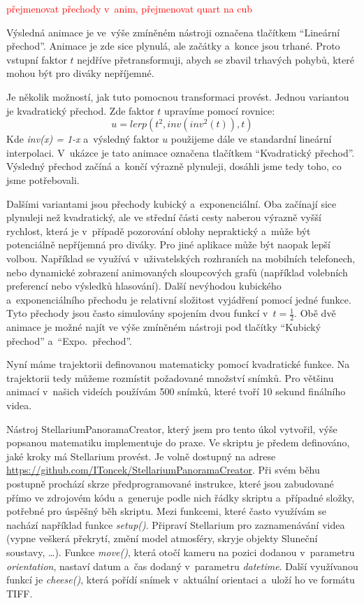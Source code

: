 \documentclass[12pt,a4paper,titlepage]{article}
\begin{document}
\textcolor{red}{přejmenovat přechody v~anim, přejmenovat quart na cub}

Výsledná animace je ve~výše zmíněném nástroji označena tlačítkem \enquote{Lineární přechod}. Animace je zde sice plynulá, ale začátky a~konce jsou trhané. Proto vstupní faktor $t$ nejdříve přetransformuji, abych se zbavil trhavých pohybů, které mohou být pro diváky nepříjemné. 

Je několik možností, jak tuto pomocnou transformaci provést. Jednou variantou je kvadratický přechod. Zde faktor $t$ upravíme pomocí rovnice:
\[u = lerp({t}^{2}, inv({inv}^{2}(t)), t)\]
Kde \textit{inv(x) = 1-x} a~výsledný faktor $u$ použijeme dále ve standardní lineární interpolaci.  V~ukázce je tato animace označena tlačítkem \enquote{Kvadratický přechod}. Výsledný přechod začíná a~končí výrazně plynuleji, dosáhli jsme tedy toho, co jsme potřebovali. %

Dalšími variantami jsou přechody kubický a~exponenciální. Oba začínají sice plynuleji než kvadratický, ale ve střední části cesty naberou výrazně vyšší rychlost, která je v~případě pozorování oblohy nepraktický a~může být potenciálně nepříjemná pro diváky. Pro jiné aplikace může být naopak lepší volbou. Například se využívá v~uživatelských rozhraních na mobilních telefonech, nebo dynamické zobrazení animovaných sloupcových grafů (například volebních preferencí nebo výsledků hlasování). Další nevýhodou kubického a~exponenciálního přechodu je relativní složitost vyjádření pomocí jedné funkce. Tyto přechody jsou často simulovány spojením dvou funkcí v~$t=\frac{1}{2}$. Obě dvě animace je možné najít ve výše zmíněném nástroji pod tlačítky \enquote{Kubický přechod} a~\enquote{Expo.\ přechod}.

Nyní máme trajektorii definovanou matematicky pomocí kvadratické funkce. Na trajektorii tedy můžeme rozmístit požadované množství snímků. Pro většinu animací v~našich videích používám 500 snímků, které tvoří 10 sekund finálního videa.

Nástroj StellariumPanoramaCreator, který jsem pro tento úkol vytvořil, výše popsanou matematiku implementuje do praxe. Ve skriptu je předem definováno, jaké kroky má Stellarium provést. Je volně dostupný na adrese \url{https://github.com/IToncek/StellariumPanoramaCreator}. Při svém běhu postupně prochází skrze předprogramované instrukce, které jsou zabudované přímo ve zdrojovém kódu a~generuje podle nich řádky skriptu a~případné složky, potřebné pro úspěšný běh skriptu. Mezi funkcemi, které často využívám se nachází například funkce \textit{setup()}. Připraví Stellarium pro zaznamenávání videa (vypne veškerá překrytí, změní model atmosféry, skryje objekty Sluneční soustavy, \ldots). Funkce \textit{move()}, která otočí kameru na pozici dodanou v~parametru \textit{orientation}, nastaví datum a~čas dodaný v~parametru \textit{datetime}. Další využívanou funkcí je \textit{cheese()}, která pořídí snímek v~aktuální orientaci a~uloží ho ve formátu TIFF.%
\end{document}
